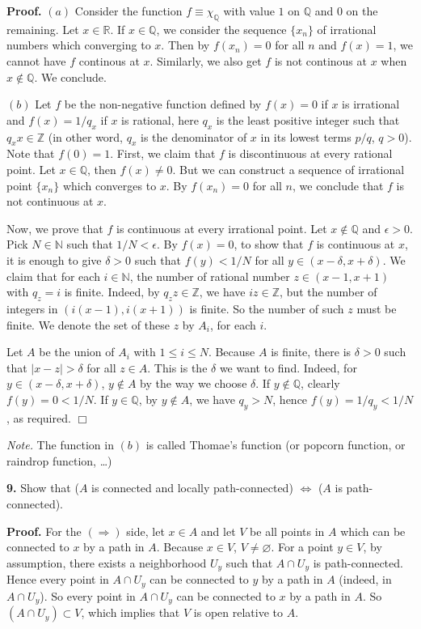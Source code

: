 \documentclass{article}
\begin{document}
\textbf{Proof.} $(a)$ Consider the function $f \equiv \chi_{\mathbb{Q}}$
with value $1$ on $\mathbb{Q}$ and $0$ on the remaining. Let
$x\in \mathbb{R}$. If $x\in \mathbb{Q}$, we consider the sequence
$\{x_n\}$ of irrational numbers which converging to $x$. Then by
$f(x_n) = 0$ for all $n$ and $f(x) = 1$, we cannot have $f$ continous at
$x$. Similarly, we also get $f$ is not continous at $x$ when
$x\notin \mathbb{Q}$. We conclude.

$(b)$ Let $f$ be the non-negative function defined by $f(x) = 0$ if $x$
is irrational and $f(x) = 1/q_x$ if $x$ is rational, here $q_x$ is the
least positive integer such that $q_xx \in \mathbb{Z}$ (in other word,
$q_x$ is the denominator of $x$ in its lowest terms $p/q$, $q>0$). Note
that $f(0) = 1$. First, we claim that $f$ is discontinuous at every
rational point. Let $x\in \mathbb{Q}$, then $f(x) \ne 0$. But we can
construct a sequence of irrational point $\{x_n\}$ which converges to
$x$. By $f(x_n) = 0$ for all $n$, we conclude that $f$ is not continuous
at $x$.

Now, we prove that $f$ is continuous at every irrational point. Let
$x\notin \mathbb{Q}$ and $\epsilon > 0$. Pick $N\in \mathbb{N}$ such
that $1/N < \epsilon$. By $f(x) = 0$, to show that $f$ is continuous at
$x$, it is enough to give $\delta > 0$ such that $f(y) < 1/N$ for all
$y \in (x-\delta, x+\delta)$. We claim that for each $i\in \mathbb{N}$,
the number of rational number $z\in (x-1,x+1)$ with $q_z = i$ is finite.
Indeed, by $q_zz \in \mathbb{Z}$, we have $iz \in \mathbb{Z}$, but the
number of integers in $(i(x-1),i(x+1))$ is finite. So the number of such
$z$ must be finite. We denote the set of these $z$ by $A_i$, for each
$i$.

Let $A$ be the union of $A_i$ with $1\le i\le N$. Because $A$ is finite,
there is $\delta > 0$ such that $|x-z| > \delta$ for all $z\in A$. This
is the $\delta$ we want to find. Indeed, for
$y\in (x-\delta, x+\delta)$, $y \notin A$ by the way we choose $\delta$.
If $y\notin \mathbb{Q}$, clearly $f(y) = 0 < 1/N$. If $y\in \mathbb{Q}$,
by $y\notin A$, we have $q_y  > N$, hence $f(y) = 1/q_y < 1/N$, as
required. $\Box$

\emph{Note.} The function in $(b)$ is called Thomae's function (or
popcorn function, or raindrop function, \ldots{})

    \textbf{9.} Show that ($A$ is connected and locally path-connected)
$\Leftrightarrow$ ($A$ is path-connected).

\textbf{Proof.} For the $(\Rightarrow)$ side, let $x\in A$ and let $V$
be all points in $A$ which can be connected to $x$ by a path in $A$.
Because $x\in V$, $V\ne \varnothing$. For a point $y\in V$, by
assumption, there exists a neighborhood $U_y$ such that $A\cap U_y$ is
path-connected. Hence every point in $A \cap U_y$ can be connected to
$y$ by a path in $A$ (indeed, in $A\cap U_y$). So every point in
$A\cap U_y$ can be connected to $x$ by a path in $A$. So
$(A\cap U_y) \subset V$, which implies that $V$ is open relative to $A$.
\end{document}
